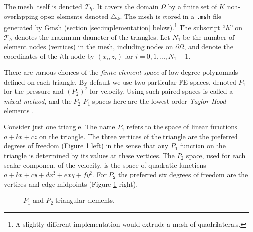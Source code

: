 \documentclass[letterpaper,final,12pt,reqno]{amsart}
\begin{document}
The mesh itself is denoted $\mathcal{T}_h$.  It covers the domain $\Omega$ by a finite set of $K$ non-overlapping open elements denoted $\triangle_k$.  The mesh is stored in a \texttt{.msh} file generated by Gmsh (section \ref{sec:implementation} below).\footnote{A slightly-different implementation would extrude a mesh of quadrilaterals.}  The subscript ``$h$'' on $\mathcal{T}_h$ denotes the maximum diameter of the triangles.  Let $N_1$ be the number of element nodes (vertices) in the mesh, including nodes on $\partial\Omega$, and denote the coordinates of the $i$th node by $(x_i,z_i)$ for $i=0,1,\dots,N_1-1$.

There are various choices of the \emph{finite element space} of low-degree polynomials defined on each triangle.  By default we use two particular FE spaces, denoted $P_1$ for the pressure and $(P_2)^2$ for velocity.  Using such paired spaces is called a \emph{mixed method}, and the $P_2$-$P_1$ spaces here are the lowest-order \emph{Taylor-Hood} elements \cite{Elmanetal2014}.

Consider just one triangle.  The name $P_1$ refers to the space of linear functions $a + b x + c z$ on the triangle.  The three vertices of the triangle are the preferred degrees of freedom (Figure \ref{fig:fedofs} left) in the sense that any $P_1$ function on the triangle is determined by its values at these vertices.  The $P_2$ space, used for each scalar component of the velocity, is the space of quadratic functions $a + bx + cy + dx^2 + exy + fy^2$.  For $P_2$ the preferred six degrees of freedom are the vertices and edge midpoints (Figure \ref{fig:fedofs} right).

\begin{figure}[ht]
\caption{$P_1$ and $P_2$ triangular elements.}
\label{fig:fedofs}
\end{figure}
\end{document}
